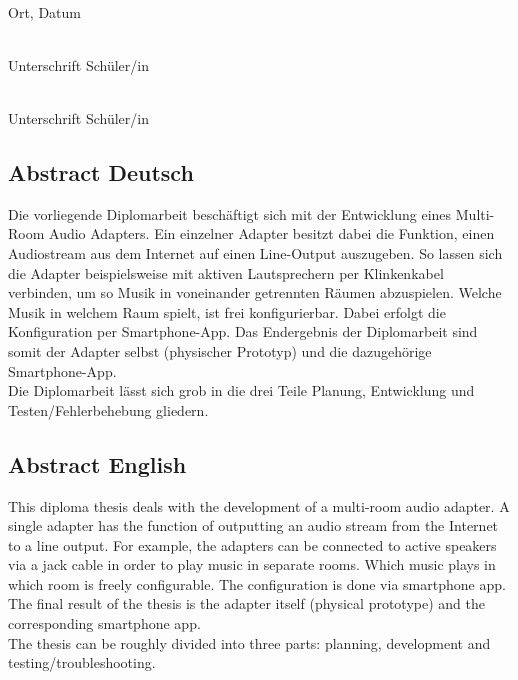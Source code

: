 \documentclass[11pt, twoside]{article}
\begin{document}
\vspace{30mm}

\noindent
\begin{minipage}[c]{5cm}
	\centering \dotfill \\
	Ort, Datum
\end{minipage}
\hfill
    \begin{minipage}[c]{5cm}
        \centering \dotfill \\
        Unterschrift Schüler/in
    \end{minipage}
    
\vspace{10mm}

\noindent
\begin{flushright}
    \begin{minipage}[c]{5cm}
        \centering \dotfill \\
        Unterschrift Schüler/in
    \end{minipage}
\end{flushright}

\pagebreak

\subsection{Abstract Deutsch}
Die vorliegende Diplomarbeit beschäftigt sich mit der Entwicklung eines Multi-Room Audio Adapters. Ein einzelner Adapter besitzt dabei die Funktion, einen Audiostream aus dem Internet auf einen Line-Output auszugeben. So lassen sich die Adapter beispielsweise mit aktiven Lautsprechern per Klinkenkabel verbinden, um so Musik in voneinander getrennten Räumen abzuspielen. Welche Musik in welchem Raum spielt, ist frei konfigurierbar. Dabei erfolgt die Konfiguration per Smartphone-App. Das Endergebnis der Diplomarbeit sind somit der Adapter selbst (physischer Prototyp) und die dazugehörige Smartphone-App. \newline \\
Die Diplomarbeit lässt sich grob in die drei Teile Planung, Entwicklung und Testen/Fehlerbehebung gliedern.
\subsection{Abstract English}
This diploma thesis deals with the development of a multi-room audio adapter. A single adapter has the function of outputting an audio stream from the Internet to a line output. For example, the adapters can be connected to active speakers via a jack cable in order to play music in separate rooms. Which music plays in which room is freely configurable. The configuration is done via smartphone app. The final result of the thesis is the adapter itself (physical prototype) and the corresponding smartphone app. \newline \\
The thesis can be roughly divided into three parts: planning, development and testing/troubleshooting.
\end{document}
